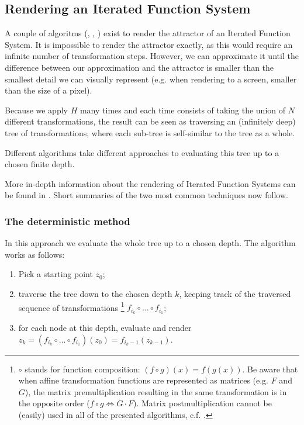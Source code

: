 \documentclass[11pt]{article}
\begin{document}
\subsection{Rendering an Iterated Function System}
\label{sec:org251c56b}

A couple of algoritms (\cite{barnsley1988fractals}, \cite{hepting1991rendering}, \cite{lawlor2012gpu}) exist to render the attractor of an Iterated Function System. 
It is impossible to render the attractor exactly, as this would require an infinite number of transformation steps.
However, we can approximate it until the difference between our approximation and the attractor is smaller than
the smallest detail we can visually represent (e.g. when rendering to a screen, smaller than the size of a pixel).

Because we apply \(H\) many times and each time consists of taking the union of \(N\) different transformations,
the result can be seen as traversing an (infinitely deep) tree of transformations, 
where each sub-tree is self-similar to the tree as a whole.


Different algorithms take different approaches to evaluating this tree up to a chosen finite depth.

More in-depth information about the rendering of Iterated Function Systems can be found in \cite{hepting1991rendering}. 
Short summaries of the two most common techniques now follow.

\subsubsection{The deterministic method}
\label{sec:orgef4b8a3}

In this approach we evaluate the whole tree up to a chosen depth. The algorithm works as follows:

\begin{enumerate}
\item Pick a starting point \(z_0\);
\item traverse the tree down to the chosen depth \(k\), keeping track of the traversed sequence of transformations \footnote{\(\circ\) stands for function composition: \((f \circ g)(x) = f(g(x))\). 
Be aware that when affine transformation functions are represented as matrices (e.g. \(F\) and \(G\)), the matrix premultiplication resulting in the same transformation is in the opposite order (\(f \circ g \Leftrightarrow G \cdot F\)). Matrix postmultiplication cannot be (easily) used in all of the presented algorithms, c.f. \cite{hepting1991rendering}.}
\(f_{i_k} \circ \ldots \circ f_{i_1}\);
\item for each node at this depth, evaluate and render \(z_k = (f_{i_k} \circ \ldots \circ f_{i_1})(z_0) = f_{i_k-1}(z_{k-1})\).
\end{enumerate}
\end{document}
